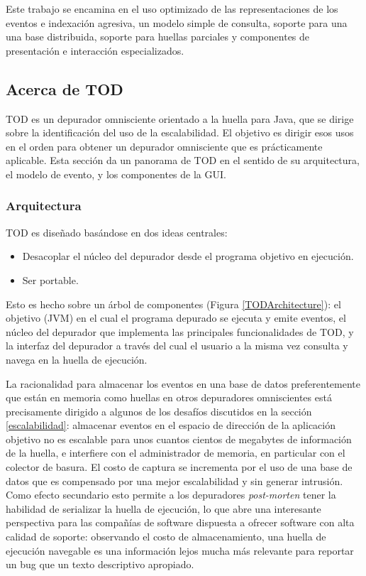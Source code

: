 \documentclass[12pt,legalpaper]{report}
\begin{document}
 	Este trabajo se encamina en el uso optimizado de las representaciones de los eventos e indexación agresiva, un modelo simple de consulta, soporte para una una base distribuida, soporte para huellas parciales y componentes de presentación e interacción especializados.

		\subsection{Acerca de TOD}

TOD es un depurador omnisciente orientado a la huella para Java, que se dirige sobre la identificación del uso de la escalabilidad.  El objetivo es dirigir esos usos en el orden para obtener un depurador omnisciente que es prácticamente aplicable.  Esta sección da un panorama de TOD en el sentido de su arquitectura, el modelo de evento, y los componentes de la GUI.

			\subsubsection{Arquitectura}

TOD es diseñado basándose en dos ideas centrales:

\begin{itemize}
	\item Desacoplar el núcleo del depurador desde el programa objetivo en ejecución.
	\item Ser portable.  
\end{itemize}

Esto es hecho sobre un árbol de componentes (Figura \ref{TODArchitecture}):  el objetivo (JVM) en el cual el programa depurado se ejecuta y emite eventos, el núcleo del depurador que implementa las principales funcionalidades de TOD, y la interfaz del depurador a través del cual el usuario a la misma vez consulta y navega en la huella de ejecución.

La racionalidad para almacenar los eventos en una base de datos preferentemente que están en memoria como huellas en otros depuradores omniscientes \cite{bitd, odb, zstep} está precisamente dirigido a algunos de los desafíos discutidos en la sección \ref{escalabilidad}:  almacenar eventos en el espacio de dirección de la aplicación objetivo no es escalable para unos cuantos cientos de megabytes de información de la huella, e interfiere con el administrador de memoria, en particular con el colector de basura.  El costo de captura se incrementa por el uso de una base de datos que es compensado por una mejor escalabilidad y sin generar intrusión.  Como efecto secundario esto permite a los depuradores \textit{post-morten} tener la habilidad de serializar la huella de ejecución, lo que abre una interesante perspectiva para las compañías de software dispuesta a ofrecer software con alta calidad de soporte:  observando el costo de almacenamiento, una huella de ejecución navegable es una información lejos mucha más relevante para reportar un bug que un texto descriptivo apropiado. 
\end{document}
